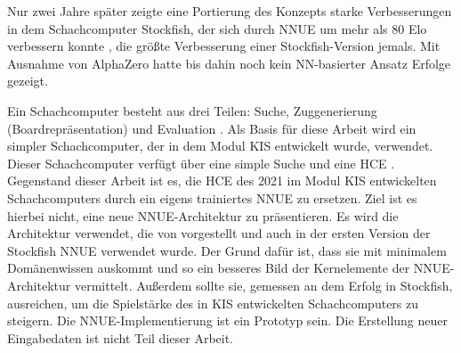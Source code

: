 Nur zwei Jahre später zeigte eine Portierung des Konzepts starke Verbesserungen in dem Schachcomputer Stockfish, der sich durch \ac{NNUE} um mehr als 80 Elo verbessern konnte \cite{StockfishIntroducingNNUE}, die größte Verbesserung einer Stockfish-Version jemals. Mit Ausnahme von AlphaZero \cite{Silver2017} hatte bis dahin noch kein \ac{NN}-basierter Ansatz Erfolge gezeigt.


Ein Schachcomputer besteht aus drei Teilen: Suche, Zuggenerierung (Boardrepräsentation) und Evaluation \cite{VazquezFernandez2013}. Als Basis für diese Arbeit wird ein simpler Schachcomputer, der in dem Modul \ac{KIS} entwickelt wurde, verwendet. Dieser Schachcomputer verfügt über eine simple Suche und eine \ac{HCE} \cite{nopy}. Gegenstand dieser Arbeit ist es, die \ac{HCE} des 2021 im Modul \ac{KIS} entwickelten Schachcomputers durch ein eigens trainiertes \ac{NNUE} zu ersetzen. Ziel ist es hierbei nicht, eine neue \ac{NNUE}-Architektur zu präsentieren. Es wird die Architektur verwendet, die von \citeauthor{YNasu2018} \cite{YNasu2018} vorgestellt und auch in der ersten Version der Stockfish \ac{NNUE} verwendet wurde. Der Grund dafür ist, dass sie mit minimalem Domänenwissen auskommt und so ein besseres Bild der Kernelemente der \ac{NNUE}-Architektur vermittelt. Außerdem sollte sie, gemessen an dem Erfolg in Stockfish, ausreichen, um die Spielstärke des in \ac{KIS} entwickelten Schachcomputers zu steigern. Die \ac{NNUE}-Implementierung ist ein Prototyp sein. Die Erstellung neuer Eingabedaten ist nicht Teil dieser Arbeit.